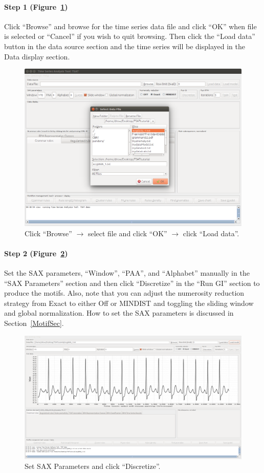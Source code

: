 \documentclass[titlepage, letterpaper, 12pt]{article}
\begin{document}


\paragraph{Step 1 (Figure~\ref{fig:step1-browse})} Click ``Browse'' and browse for the time series data file and click ``OK'' when file is selected or ``Cancel'' if you wish to quit browsing.  Then click the ``Load data'' button in the data source section and the time series will be displayed in the Data display section.

\begin{figure}[H]
	\centering
	\includegraphics[width=0.7\linewidth]{pictures/motifguide/step1-browse}
	\caption{Click ``Browse'' $\rightarrow$ select file and click ``OK'' $\rightarrow$ click ``Load data''.}
	\label{fig:step1-browse}
\end{figure}


\paragraph{Step 2 (Figure~\ref{fig:step2-loaded})} Set the SAX parameters, ``Window'', ``PAA'', and ``Alphabet'' manually in the ``SAX Parameters'' section and then click ``Discretize'' in the ``Run GI'' section to produce the motifs.  Also, note that you can adjust the numerosity reduction strategy from Exact to either Off or MINDIST and toggling the sliding window and global normalization. How to set the SAX parameters is discussed in Section~\ref{MotifSec}.

\begin{figure}[H]
	\centering
	\includegraphics[width=0.7\linewidth]{pictures/motifguide/Step2-loaded}
	\caption{Set SAX Parameters and click ``Discretize''.}
	\label{fig:step2-loaded}
\end{figure}
\end{document}
